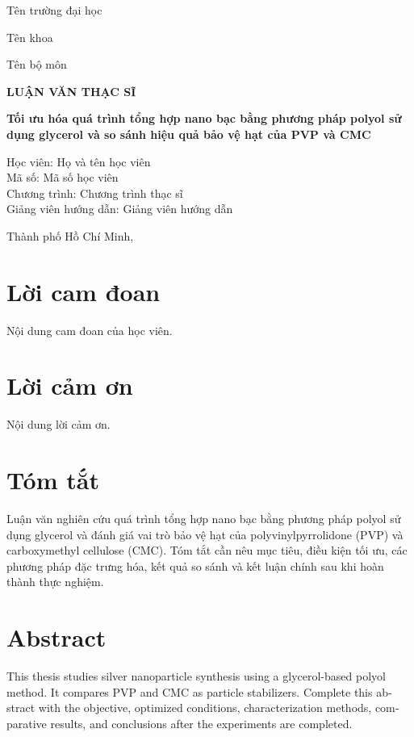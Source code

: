 \documentclass[13pt,a4paper,openright]{extreport}
\newcommand{\university}{Tên trường đại học}
\newcommand{\faculty}{Tên khoa}
\newcommand{\department}{Tên bộ môn}
\newcommand{\program}{Chương trình thạc sĩ}
\newcommand{\thesistitle}{Tối ưu hóa quá trình tổng hợp nano bạc bằng phương pháp polyol sử dụng glycerol và so sánh hiệu quả bảo vệ hạt của PVP và CMC}
\newcommand{\studentname}{Họ và tên học viên}
\newcommand{\studentid}{Mã số học viên}
\newcommand{\supervisor}{Giảng viên hướng dẫn}
\newcommand{\submissionplace}{Thành phố Hồ Chí Minh}
\begin{document}

\begin{titlepage}
  \centering
  {\Large \university\par}
  \vspace{0.25cm}
  {\large \faculty\par}
  \vspace{0.15cm}
  {\large \department\par}
  \vfill
  {\Large \bfseries LUẬN VĂN THẠC SĨ\par}
  \vspace{0.8cm}
  {\LARGE \bfseries \thesistitle\par}
  \vspace{1.2cm}
  \begin{flushleft}
    \large
    Học viên: \studentname\\
    Mã số: \studentid\\
    Chương trình: \program\\
    Giảng viên hướng dẫn: \supervisor
  \end{flushleft}
  \vfill
  {\large \submissionplace, \the\year\par}
\end{titlepage}

\chapter*{Lời cam đoan}
Nội dung cam đoan của học viên.

\chapter*{Lời cảm ơn}
Nội dung lời cảm ơn.

\chapter*{Tóm tắt}
Luận văn nghiên cứu quá trình tổng hợp nano bạc bằng phương pháp polyol sử dụng glycerol và đánh giá vai trò bảo vệ hạt của polyvinylpyrrolidone (PVP) và carboxymethyl cellulose (CMC). Tóm tắt cần nêu mục tiêu, điều kiện tối ưu, các phương pháp đặc trưng hóa, kết quả so sánh và kết luận chính sau khi hoàn thành thực nghiệm.

\chapter*{Abstract}
\begin{english}
\raggedright
This thesis studies silver nanoparticle synthesis using a glycerol-based polyol method. It compares PVP and CMC as particle stabilizers. Complete this abstract with the objective, optimized conditions, characterization methods, comparative results, and conclusions after the experiments are completed.
\end{english}
\end{document}
